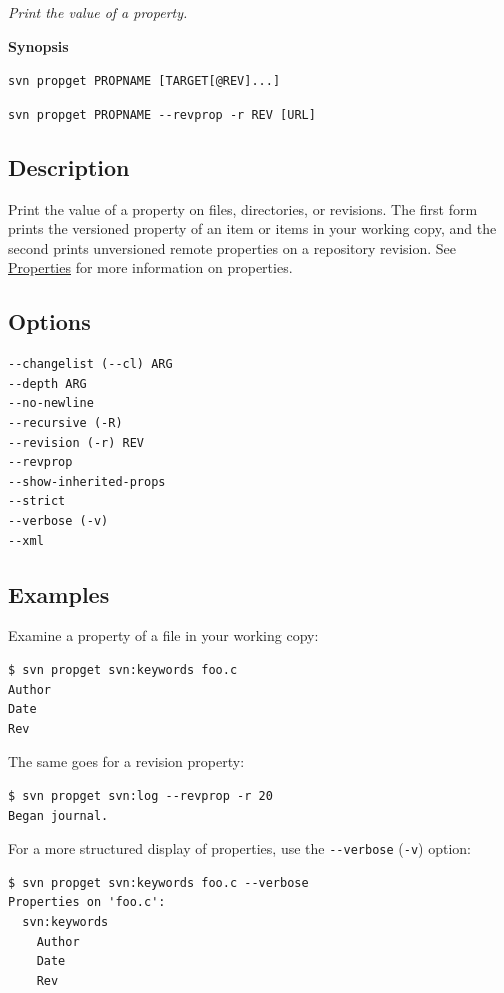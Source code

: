 \emph{Print the value of a property.}

\textbf{Synopsis}

\texttt{svn\ propget\ PROPNAME\ {[}TARGET{[}@REV{]}...{]}}

\texttt{svn\ propget\ PROPNAME\ -\/-revprop\ -r\ REV\ {[}URL{]}}

\subsection{Description}

Print the value of a property on files, directories, or revisions. The
first form prints the versioned property of an item or items in your
working copy, and the second prints unversioned remote properties on a
repository revision. See \hyperref[svn.advanced.props]{Properties} for
more information on properties.

\subsection{Options}

\begin{verbatim}
--changelist (--cl) ARG
--depth ARG
--no-newline
--recursive (-R)
--revision (-r) REV
--revprop
--show-inherited-props
--strict
--verbose (-v)
--xml
\end{verbatim}

\subsection{Examples}

Examine a property of a file in your working copy:

\begin{verbatim}
$ svn propget svn:keywords foo.c
Author
Date
Rev
\end{verbatim}

The same goes for a revision property:

\begin{verbatim}
$ svn propget svn:log --revprop -r 20 
Began journal.
\end{verbatim}

For a more structured display of properties, use the
\texttt{-\/-verbose} (\texttt{-v}) option:

\begin{verbatim}
$ svn propget svn:keywords foo.c --verbose
Properties on 'foo.c':
  svn:keywords
    Author
    Date
    Rev
\end{verbatim}

